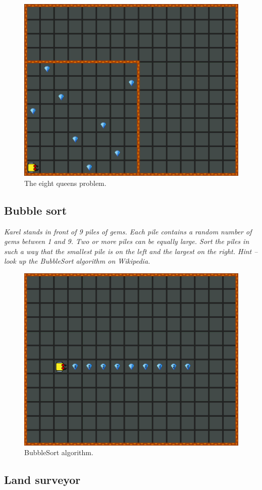 {{\begin{figure}[!ht]
\begin{center}
\includegraphics[height=0.4\textwidth]{img/i04.png}
\end{center}
\vspace{-4mm}
\caption{The eight queens problem.}
\label{fig:g14}
\end{figure}

\newpage



\subsection{Bubble sort}

\noindent
{\em Karel stands in front of 9 piles of gems. Each pile contains a random number of gems between 1 and 9. 
Two or more piles can be equally large. Sort the piles in such a way that the smallest pile is on the left 
and the largest on the right. Hint -- look up the BubbleSort algorithm on Wikipedia.}

\begin{figure}[!ht]
\begin{center}
\includegraphics[height=0.4\textwidth]{img/i05.png}
\end{center}
\vspace{-4mm}
\caption{BubbleSort algorithm.}
\label{fig:g13}
\end{figure}
\noindent

\newpage
\subsection{Land surveyor}

}}
